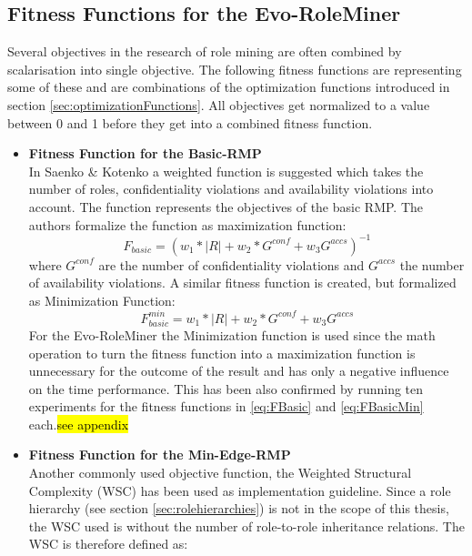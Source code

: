         \subsection{Fitness Functions for the Evo-RoleMiner}
        \label{sec:fitnessFunctions}
        Several objectives in the research of role mining are often combined by scalarisation into single objective. The following fitness functions are representing some of these and are combinations of the optimization functions introduced in section \ref{sec:optimizationFunctions}. All objectives get normalized to a value between 0 and 1 before they get into a combined fitness function.
        \begin{itemize}
            \item \textbf{Fitness Function for the Basic-RMP}\\
            In Saenko \& Kotenko\cite{saenko2012design} a weighted function is suggested which takes the number of roles, confidentiality violations and availability violations into account. The function represents the objectives of the basic RMP. The authors formalize the function as maximization function:
            \begin{equation}\label{eq:FBasic}
                F_{basic} = (w_1 * |R| + w_2 * G^{conf} + w_3 G^{accs})^{-1}
            \end{equation}    
            where $G^{conf}$ are the number of confidentiality violations and $G^{accs}$ the number of availability violations. A similar fitness function is created, but formalized as Minimization Function:
            \begin{equation}\label{eq:FBasicMin}
                F_{basic}^{min} = w_1 * |R| + w_2 * G^{conf} + w_3 G^{accs}
            \end{equation}
            For the Evo-RoleMiner the Minimization function is used since the math operation to turn the fitness function into a maximization function is unnecessary for the outcome of the result and has only a negative influence on the time performance. This has been also confirmed by running ten experiments for the fitness functions in \eqref{eq:FBasic} and \eqref{eq:FBasicMin} each.\hl{see appendix}
            \item \textbf{Fitness Function for the Min-Edge-RMP}\\
            Another commonly used objective function, the Weighted Structural Complexity (WSC)\cite{Molloy}\cite{Xu} has been used as implementation guideline. Since a role hierarchy (see section \ref{sec:rolehierarchies}) is not in the scope of this thesis, the WSC used is without the number of role-to-role inheritance relations. The WSC is therefore defined as:

\end{itemize}
